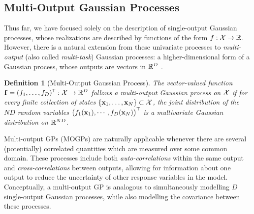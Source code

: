 \documentclass[10pt]{article}
\newtheorem{definition}{Definition}
\begin{document}
\subsection{Multi-Output Gaussian Processes}
\label{subsec:intro-MOGP}
Thus far, we have focused solely on the description of single-output Gaussian processes, whose realizations are described by functions of the form $f: \mathcal{X} \to \mathbb{R}$. However, there is a natural extension from these univariate processes to \emph{multi-output} (also called \emph{multi-task}) Gaussian processes: a higher-dimensional form of a Gaussian process, whose outputs are vectors in $\mathbb{R}^{D}$ \citep{Alvarez-Vector-Kernels-2012,Bonilla-Multitask-GP-2007}. 

\begin{definition}[Multi-Output Gaussian Process]
\label{def:MOGP}
    The vector-valued function $\mathbf{f} = (f_{1}, \dots, f_{D})^{\scriptstyle{\mathsf{T}}}: \mathcal{X} \to \mathbb{R}^{D}$ follows a multi-output Gaussian process on $\mathcal{X}$ if for every finite collection of states $\{\mathbf{x}_{1}, \dots, \mathbf{x}_{N}\} \subset \mathcal{X}$, the joint distribution of the $ND$ random variables $\big(f_{1}(\mathbf{x}_{1}), \cdots, f_{D}(\mathbf{x}_{N})\big)^{\scriptstyle{\mathsf{T}}}$ is a multivariate Gaussian distribution on $\mathbb{R}^{ND}$.
\end{definition}

Multi-output GPs (MOGPs) are naturally applicable whenever there are several (potentially) correlated quantities which are measured over some common domain. These processes include both \emph{auto-correlations} within the same output and \emph{cross-correlations} between outputs, allowing for information about one output to reduce the uncertainty of other response variables in the model. Conceptually, a multi-output GP is analogous to simultaneously modelling $D$ single-output Gaussian processes, while also modelling the covariance between these processes.
\end{document}
